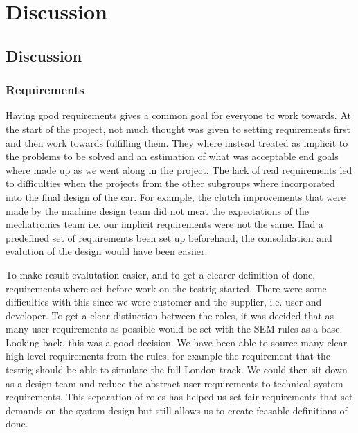 \chapter{Discussion}
\section{Discussion}

\subsection{Requirements}
Having good requirements gives a common goal for everyone to work towards. At
the start of the project, not much thought was given to setting requirements
first and then work towards fulfilling them. They where instead treated as
implicit to the problems to be solved and an estimation of what was acceptable
end goals where made up as we went along in the project. The lack of real
requirements led to difficulties when the projects from the other subgroups
where incorporated into the final design of the car. For example, the clutch
improvements that were made by the machine design team did not meat the
expectations of the mechatronics team i.e. our implicit requirements were not
the same. Had a predefined set of requirements been set up beforehand, the
consolidation and evalution of the design would have been easiier.

To make result evalutation easier, and to get a clearer definition of done,
requirements where set before work on the testrig started. There were some
difficulties with this since we were customer and the supplier, i.e. user and
developer. To get a clear distinction between the roles, it was decided that as
many user requirements as possible would be set with the SEM rules as a base.
Looking back, this was a good decision. We have been able to source many clear
high-level requirements from the rules, for example the requirement that the
testrig should be able to simulate the full London track. We could then sit down
as a design team and reduce the abstract user requirements to technical system
requirements. This separation of roles has helped us set fair requirements that
set demands on the system design but still allows us to create feasable
definitions of done. 

